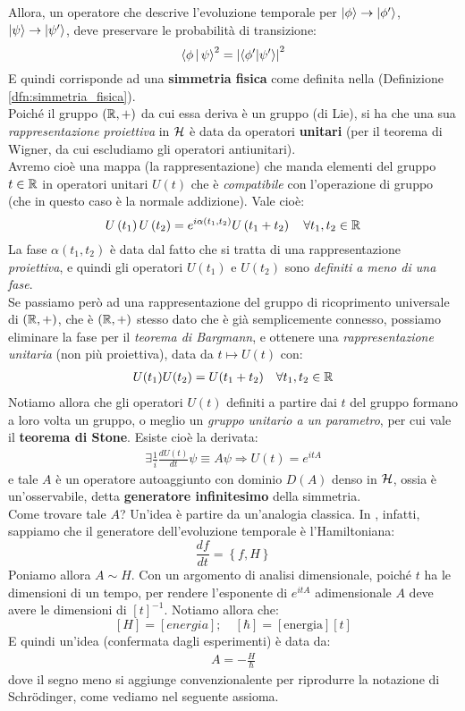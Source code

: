 \documentclass[../../FisicaTeorica.tex]{subfiles}
\begin{document}
Allora, un operatore che descrive l'evoluzione temporale per $\Ket{\phi}\to |\phi^\prime\rangle$, $\Ket{\psi}\to |\psi^\prime\rangle$, deve preservare le probabilità di transizione:
\[
\Braket{\phi|\psi}^2=\left|\left\langle\phi^\prime\middle|\psi^\prime\right\rangle\right|^2
\]
E quindi corrisponde ad una \textbf{simmetria fisica} come definita nella (Definizione \ref{dfn:simmetria_fisica}).\\
Poiché il gruppo $(\mathbb{R},+)$ da cui essa deriva è un gruppo  (di Lie), si ha che una sua \textit{rappresentazione proiettiva} in $\mathcal{H}$ è data da operatori \textbf{unitari} (per il teorema di Wigner, da cui escludiamo gli operatori antiunitari).\\
Avremo cioè una mappa (la rappresentazione) che manda elementi del gruppo $t\in \mathbb{R}$ in operatori unitari $U(t)$ che è \textit{compatibile} con l'operazione di gruppo (che in questo caso è la normale addizione). Vale cioè:
\[
U\left(t_1\right)U\left(t_2\right)=e^{i\alpha\left(t_1,t_2\right)}U\left(t_1+t_2\right)\quad \forall t_1,t_2\in \mathbb{R}
\]
La fase $\alpha(t_1,t_2)$ è data dal fatto che si tratta di una rappresentazione \textit{proiettiva}, e quindi gli operatori $U(t_1)$ e $U(t_2)$ sono \textit{definiti a meno di una fase}.\\
Se passiamo però ad una rappresentazione del gruppo di ricoprimento universale di $(\mathbb{R},+)$, che è $(\mathbb{R},+)$ stesso dato che è già semplicemente connesso, possiamo eliminare la fase per il \textit{teorema di Bargmann}, e ottenere una \textit{rappresentazione unitaria} (non più proiettiva), data da $t\mapsto U(t)$ con:
\begin{align*}
U(t_1)U(t_2) = U(t_1+t_2)\quad \forall t_1,t_2 \in \mathbb{R}
\end{align*}
Notiamo allora che gli operatori $U(t)$ definiti a partire dai $t$ del gruppo formano a loro volta un gruppo, o meglio un \textit{gruppo unitario a un parametro}, per cui vale il \textbf{teorema di Stone}. Esiste cioè la derivata:
\begin{align*}
\exists \frac{1}{i}\frac{dU(t)}{dt}\psi \equiv A\psi \Rightarrow U(t) = e^{itA}
\end{align*}
e tale $A$ è un operatore autoaggiunto con dominio $D(A)$ denso in $\mathcal{H}$, ossia è un'osservabile, detta \textbf{generatore infinitesimo} della simmetria.\\ %

Come trovare tale $A$? Un'idea è partire da un'analogia classica. In \MC, infatti, sappiamo che il generatore dell'evoluzione temporale è l'Hamiltoniana:
\[
\frac{df}{dt}=\left\{f,H\right\}
\]
Poniamo allora $A \sim H$. Con un argomento di analisi dimensionale, poiché $t$ ha le dimensioni di un tempo, per rendere l'esponente di $e^{itA}$ adimensionale $A$ deve avere le dimensioni di $[t]^{-1}$. Notiamo allora che: 
\[
\left[H\right]=\left[energia\right]; \quad
\left[\hbar\right]=\left[\text{energia}\right]\left[t\right]
\]
E quindi un'idea (confermata dagli esperimenti) è data da:
\begin{align*}
A=-\frac{H}{\hbar}
\end{align*}
dove il segno meno si aggiunge convenzionalente per riprodurre la notazione di Schrödinger, come vediamo nel seguente assioma.
\end{document}
